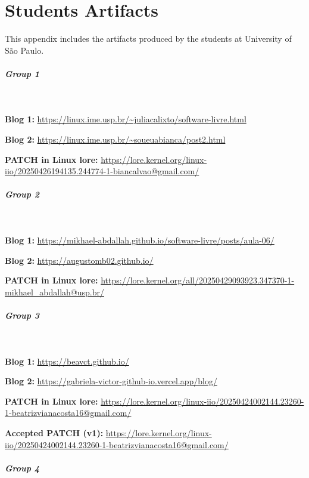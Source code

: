 \chapter{Students Artifacts}

\label{app:stuart}

This appendix includes the artifacts produced by the students at University of São Paulo.

\paragraph{Group 1}

\

\textbf{Blog 1:} \url{https://linux.ime.usp.br/~juliacalixto/software-livre.html}

\textbf{Blog 2:} \url{https://linux.ime.usp.br/~soueuabianca/post2.html}

\textbf{PATCH in Linux lore:} \url{https://lore.kernel.org/linux-iio/20250426194135.244774-1-biancalvao@gmail.com/}

\paragraph{Group 2}

\

\textbf{Blog 1:} \url{https://mikhael-abdallah.github.io/software-livre/posts/aula-06/}

\textbf{Blog 2:} \url{https://augustomb02.github.io/}

\textbf{PATCH in Linux lore:} \url{https://lore.kernel.org/all/20250429093923.347370-1-mikhael_abdallah@usp.br/}

\paragraph{Group 3}

\

\textbf{Blog 1:} \url{https://beavct.github.io/}

\textbf{Blog 2:} \url{https://gabriela-victor-github-io.vercel.app/blog/}

\textbf{PATCH in Linux lore:} \url{https://lore.kernel.org/linux-iio/20250424002144.23260-1-beatrizvianacosta16@gmail.com/}

\textbf{Accepted PATCH (v1):} \url{https://lore.kernel.org/linux-iio/20250424002144.23260-1-beatrizvianacosta16@gmail.com/}

\paragraph{Group 4}

